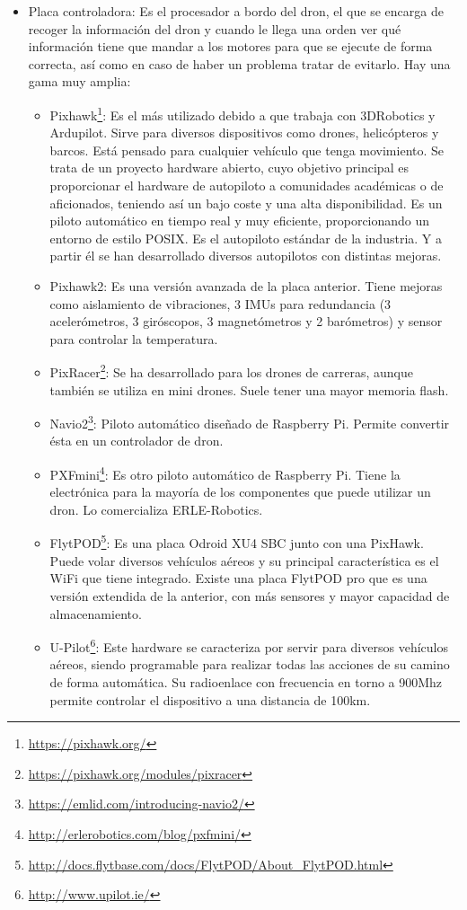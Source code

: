 \begin{itemize}
\item Placa controladora: Es el procesador a bordo del dron, el que se encarga de recoger
la información del dron y cuando le llega una orden ver qué información tiene que
mandar a los motores para que se ejecute de forma correcta, así como en caso de haber un
problema tratar de evitarlo. Hay una gama muy amplia:
	\begin{itemize}
	\item Pixhawk\footnote{\url{https://pixhawk.org/}}: Es el más utilizado debido a que trabaja con 3DRobotics y Ardupilot. Sirve para diversos dispositivos como drones, helicópteros y barcos. Está pensado para cualquier vehículo que tenga movimiento. Se trata de un proyecto hardware abierto, cuyo objetivo principal es proporcionar el hardware de autopiloto a comunidades académicas o de aficionados, teniendo así un bajo coste y una alta disponibilidad. Es un piloto automático en tiempo real y muy eficiente, proporcionando un entorno de estilo POSIX. Es el autopiloto estándar de la industria. Y a partir él se han desarrollado diversos autopilotos con distintas mejoras. 	
    \item Pixhawk2: Es una versión avanzada de la placa anterior. Tiene mejoras como aislamiento de vibraciones, 3 IMUs para redundancia (3 acelerómetros, 3 giróscopos, 3 magnetómetros y 2 barómetros) y sensor para controlar la temperatura.
	\item PixRacer\footnote{\url{https://pixhawk.org/modules/pixracer}}: Se ha desarrollado para los drones de carreras, aunque también se utiliza en mini drones. Suele tener una mayor memoria flash.
	\item Navio2\footnote{\url{https://emlid.com/introducing-navio2/}}: Piloto automático diseñado de Raspberry Pi. Permite convertir ésta en un controlador de dron.
	\item PXFmini\footnote{\url{http://erlerobotics.com/blog/pxfmini/}}: Es otro piloto automático de Raspberry Pi. Tiene la electrónica para la mayoría de los componentes que puede utilizar un dron. Lo comercializa ERLE-Robotics.
	\item FlytPOD\footnote{\url{http://docs.flytbase.com/docs/FlytPOD/About_FlytPOD.html}}: Es una placa Odroid XU4 SBC junto con una PixHawk. Puede volar diversos vehículos aéreos y su principal característica es el WiFi que tiene integrado. Existe una placa FlytPOD pro que es una versión extendida de la anterior, con más sensores y mayor capacidad de almacenamiento.
	\item U-Pilot\footnote{\url{http://www.upilot.ie/}}: Este hardware se caracteriza por servir para diversos vehículos aéreos,
siendo programable para realizar todas las acciones de su camino de forma
automática. Su radioenlace con frecuencia en torno a 900Mhz permite controlar
el dispositivo a una distancia de 100km.
	\end{itemize}

\end{itemize}

